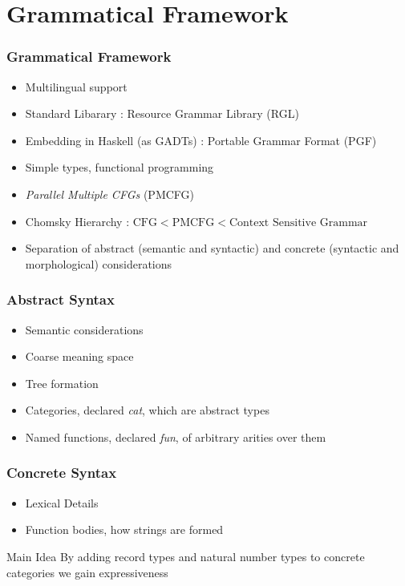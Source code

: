 \documentclass{beamer}
\begin{document}
\section{Grammatical Framework}

\begin{frame}
\frametitle{Grammatical Framework}
\begin{itemize}[<+->]
\item Multilingual support
\item Standard Libarary : Resource Grammar Library (RGL)
\item Embedding in Haskell (as GADTs) : Portable Grammar Format (PGF)
\item Simple types, functional programming
\item \emph{Parallel Multiple CFGs} (PMCFG)
\item Chomsky Hierarchy : $\text{CFG} < \text{PMCFG} < \text{Context Sensitive Grammar}$
\item Separation of abstract (semantic and syntactic) and concrete (syntactic and
 morphological) considerations
\end{itemize}
\end{frame}

\begin{frame}
\frametitle{Abstract Syntax}
\begin{itemize}[<+->]
\item Semantic considerations
\item Coarse meaning space
\item Tree formation
\item Categories, declared \emph{cat}, which are abstract types
\item Named functions, declared \emph{fun}, of arbitrary arities over them
\end{itemize}
\end{frame}

\begin{frame}
\frametitle{Concrete Syntax}
\begin{itemize}[<+->]
\item Lexical Details
\item Function bodies, how strings are formed
\end{itemize}
\pause
\begin{alertblock}{Main Idea}
By adding record types and natural number types to concrete categories we gain expressiveness
\end{alertblock}
\end{frame}
\end{document}
